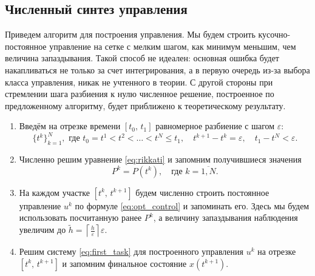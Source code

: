 \subsection{Численный синтез управления}

Приведем алгоритм для построения управления.
Мы будем строить кусоч\-но-постоянное управление на сетке с мелким шагом, как минимум меньшим, чем величина запаздывания.
Такой способ не идеален: основная ошибка будет накапливаться не только за счет интегрирования, а в первую очередь из-за выбора класса управления, никак не учтенного в теории.
С другой стороны при стремлении шага разбиения к нулю численное решение, построенное по предложенному алгоритму, будет приближено к теоретическому результату.
\begin{enumerate}
        \item Введём на отрезке времени $[t_0,\,t_1]$ равномерное разбиение с шагом $\varepsilon$:
$$
        \{t^k\}_{k=1}^{N},\mbox{ где }
        t_0 = t^1 < t^2 <\ldots<t^N \leqslant t_1,
        \quad t^{k+1} - t^k = \varepsilon,
        \quad t_1 - t^N < \varepsilon.
$$
        \item Численно решим уравнение \eqref{eq:rikkati} и запомним получившиеся значения
$$
        P^k = P(t^k),
        \quad\mbox{где } k = \overline{1,N}.
$$
        \item На каждом участке $[t^k,\,t^{k+1}]$ будем численно строить постоянное управление $u^k$ по формуле \eqref{eq:opt_control} и запоминать его. Здесь мы будем использовать посчитанную ранее $P^k$, а величину запаздывания наблюдения увеличим до $\tilde h = \left\lceil\frac{h}{\varepsilon}\right\rceil\varepsilon$.

        \item Решим систему \eqref{eq:first_task} для построенного управления $u^k$ на отрезке $[t^k,\,t^{k+1}]$ и запомним финальное состояние $x(t^{k+1})$.
\end{enumerate}
